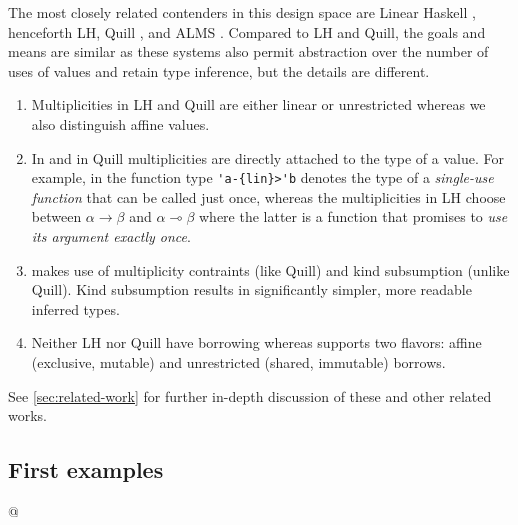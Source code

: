 The most closely related contenders in this design space are Linear Haskell
\cite{DBLP:journals/pacmpl/BernardyBNJS18}, henceforth LH,
Quill \cite{DBLP:conf/icfp/Morris16}, and ALMS \cite{DBLP:conf/popl/TovP11}.
Compared to LH and Quill, the goals and means are
similar as these systems also permit abstraction over the number of uses of
values and retain type inference, but the details are different.
\begin{enumerate}
\item Multiplicities in LH and Quill are either linear or unrestricted whereas
  we also distinguish affine values.
\item In \lang{} and in Quill multiplicities are directly attached to the type of a
  value. For example, in \lang{} the function type \lstinline/'a-{lin}>'b/
  denotes the type of a \emph{single-use function} that can be called
  just once, whereas the multiplicities in LH choose
  between $\alpha\to\beta$ and $\alpha \multimap\beta$ where the
  latter is a function that promises to \emph{use its argument exactly
    once}.
\item \lang{} makes use of multiplicity contraints (like Quill) and kind
  subsumption (unlike Quill). Kind subsumption results in significantly simpler, more readable
  inferred types.
\item Neither LH nor Quill have borrowing whereas \lang{} supports
  two flavors: affine (exclusive, mutable) and unrestricted (shared, immutable) borrows.
\end{enumerate}
See \cref{sec:related-work} for further in-depth discussion of these
and other related works.

\subsection{First examples}
\label{sec:first-example}


\lstMakeShortInline[keepspaces,basicstyle=\small\ttfamily]@

